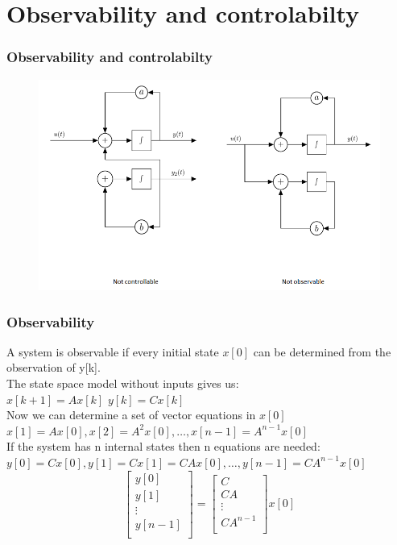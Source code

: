 \section{Observability and controlabilty}
\begin{frame}
	\frametitle{Observability and controlabilty}
	\begin{figure}
	\centering
	\includegraphics[width=0.7\linewidth]{Images/discrete_time_systems_34}
\end{figure}
\end{frame}
\begin{frame}
	\frametitle{Observability}
	\small{
	A system is observable if every initial state $x[0]$ can be determined from the observation of y[k].\\
	The state space model without inputs gives us:\\
	$x[k+1] = A x[k] $ \quad \quad				$y[k]=Cx[k]$\\
	Now we can determine a set of vector equations in $x[0]$\\
	$x[1] = A x[0],x[2]  = A^2x[0],\dots , x[n-1] = A^{n-1} x[0]$\\
	If the system has n internal states then n equations are needed:\\
	$y[0] =Cx[0],y[1]=Cx[1]=CAx[0],\dots, y[n-1] = C A^{n-1} x[0]$\\
	\[
	\begin{bmatrix}
		y[0]\\
		y[1]\\
		\vdots \\
		y[n-1]\\
	\end{bmatrix} = 
	\begin{bmatrix}
	C\\
	CA\\
	\vdots\\
	CA^{n-1}\\
	\end{bmatrix} x[0]
	\]}
\end{frame}
